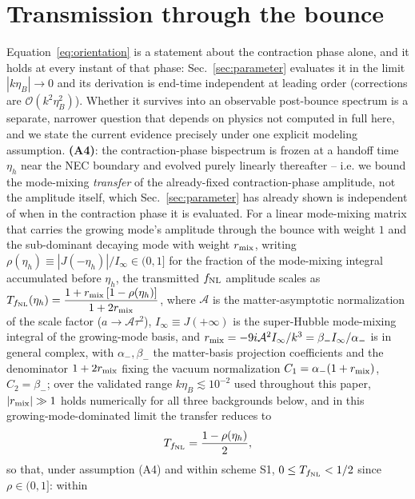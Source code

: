 \documentclass[aps,prd,twocolumn,superscriptaddress,nofootinbib,longbibliography]{revtex4-2}
\newcommand{\fnl}{f_{\rm NL}}
\begin{document}
\section{Transmission through the bounce}
\label{sec:transmission}

Equation~\eqref{eq:orientation} is a statement about the contraction phase alone,
and it holds at every instant of that phase: Sec.~\ref{sec:parameter} evaluates
it in the limit $|k\eta_B|\to0$ and its derivation is end-time independent at
leading order (corrections are $\mathcal O(k^2\eta_B^2)$). Whether it survives
into an observable post-bounce spectrum is a separate, narrower question that
depends on physics not computed in full here, and we state the current
evidence precisely under one explicit modeling assumption. \textbf{(A4)}: the
contraction-phase bispectrum is frozen at a handoff time $\eta_h$ near the NEC
boundary and evolved purely linearly thereafter -- i.e. we bound the mode-mixing
\emph{transfer} of the already-fixed contraction-phase amplitude, not the
amplitude itself, which Sec.~\ref{sec:parameter} has already shown is
independent of when in the contraction phase it is evaluated. For a linear
mode-mixing matrix that carries the growing mode's amplitude through the
bounce with weight $1$ and the sub-dominant decaying mode with weight $r_{\rm mix}$,
writing $\rho(\eta_h)\equiv|J(-\eta_h)|/I_\infty\in(0,1]$ for the fraction of the
mode-mixing integral accumulated before $\eta_h$, the transmitted $\fnl$
amplitude scales as $T_{\fnl}(\eta_h)=\dfrac{1+r_{\rm mix}\,[1-\rho(\eta_h)]}{1+2r_{\rm mix}}$,
where $\mathcal A$ is the matter-asymptotic normalization of the scale
factor ($a\to\mathcal A\tau^2$), $I_\infty\equiv J(+\infty)$ is the
super-Hubble mode-mixing integral of the growing-mode basis, and
$r_{\rm mix}=-9i\mathcal{A}^2 I_\infty/k^3=\beta_-I_\infty/\alpha_-$ is in general
complex, with $\alpha_-,\beta_-$ the matter-basis projection coefficients
and the denominator $1+2r_{\rm mix}$ fixing the vacuum normalization
$C_1=\alpha_-(1+r_{\rm mix})$, $C_2=\beta_-$; over the
validated range $k\eta_B\lesssim10^{-2}$ used throughout this paper,
$|r_{\rm mix}|\gg1$ holds numerically for all three backgrounds below, and in this
growing-mode-dominated limit the transfer reduces to
\begin{equation}
T_{\fnl}=\frac{1-\rho(\eta_h)}{2},
\end{equation}
so that, under assumption (A4) and within scheme S1, $0\le T_{\fnl}<1/2$
since $\rho\in(0,1]$: within
\end{document}
